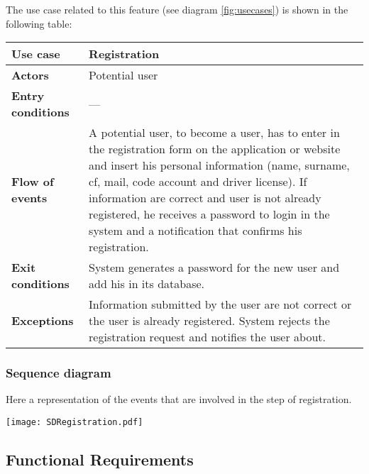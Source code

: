 \documentclass{scrreprt}
\begin{document}
The use case related to this feature (see diagram \vref{fig:usecases}) is shown in the following table:

\begin{center}
\begin{tabularx}{\columnwidth}{>{\bfseries}lX}
\toprule
Use case & Registration\\
\midrule
Actors & Potential user\\
\midrule
Entry conditions & ---\\
\midrule
Flow of events & A potential user, to become a user, has to enter in the registration form on the application or website and insert his personal information (name, surname, cf, mail, code account and driver license). If information are correct and user is not already registered, he receives a password to login in the system and a notification that confirms his registration.\\
\midrule
Exit conditions & System generates a password for the new user and add his in its database.\\
\midrule
Exceptions & Information submitted by the user are not correct or the user is already registered. System rejects the registration request and notifies the user about.\\
\bottomrule
\end{tabularx}
\end{center}

\subsubsection{Sequence diagram}
Here a representation of the events that are involved in the step of registration.
\begin{center}
\texttt{[image: SDRegistration.pdf]}
\end{center}

\begin{comment}$<$List the sequences of user actions and system responses that stimulate the 
behavior defined for this feature. These will correspond to the dialog elements 
associated with use cases.$>$
\end{comment}

\subsection{Functional Requirements}
\end{document}

